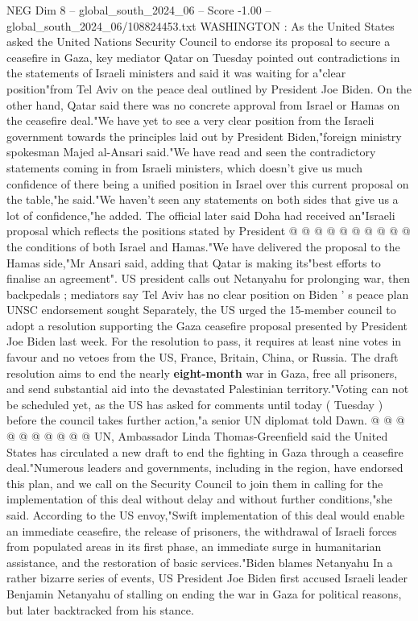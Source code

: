 \begin{textsample}{NEG Dim 8 – global\_south\_2024\_06 – Score -1.00 – global\_south\_2024\_06/108824453.txt}  \label{ex:f8_neg_044}
WASHINGTON : As the United States asked the United Nations Security Council to endorse its proposal to secure a ceasefire in Gaza, key mediator Qatar on Tuesday pointed out contradictions in the statements of Israeli ministers and said it was waiting for a"clear position"from Tel Aviv on the peace deal outlined by President Joe Biden.
On the other hand, Qatar said there was no concrete approval from Israel or Hamas on the ceasefire deal."We have yet to see a very clear position from the Israeli government towards the principles laid out by President Biden,"foreign ministry spokesman Majed al-Ansari said."We have read and seen the contradictory statements coming in from Israeli ministers, which doesn't give us much confidence of there being a unified position in Israel over this current proposal on the table,"he said."We haven't seen any statements on both sides that give us a lot of confidence,"he added.
The official later said Doha had received an"Israeli proposal which reflects the positions stated by President @ @ @ @ @ @ @ @ @ @ the conditions of both Israel and Hamas."We have delivered the proposal to the Hamas side,"Mr Ansari said, adding that Qatar is making its"best efforts to finalise an agreement".
US president calls out Netanyahu for prolonging war, then backpedals ; mediators say Tel Aviv has no clear position on Biden ' s peace plan UNSC endorsement sought Separately, the US urged the 15-member council to adopt a resolution supporting the Gaza ceasefire proposal presented by President Joe Biden last week.
For the resolution to pass, it requires at least nine votes in favour and no vetoes from the US, France, Britain, China, or Russia.
The draft resolution aims to end the nearly \textbf{eight-month} war in Gaza, free all prisoners, and send substantial aid into the devastated Palestinian territory."Voting can not be scheduled yet, as the US has asked for comments until today ( Tuesday ) before the council takes further action,"a senior UN diplomat told Dawn. @ @ @ @ @ @ @ @ @ @ UN, Ambassador Linda Thomas-Greenfield said the United States has circulated a new draft to end the fighting in Gaza through a ceasefire deal."Numerous leaders and governments, including in the region, have endorsed this plan, and we call on the Security Council to join them in calling for the implementation of this deal without delay and without further conditions,"she said.
According to the US envoy,"Swift implementation of this deal would enable an immediate ceasefire, the release of prisoners, the withdrawal of Israeli forces from populated areas in its first phase, an immediate surge in humanitarian assistance, and the restoration of basic services."Biden blames Netanyahu In a rather bizarre series of events, US President Joe Biden first accused Israeli leader Benjamin Netanyahu of stalling on ending the war in Gaza for political reasons, but later backtracked from his stance.

\end{textsample}
